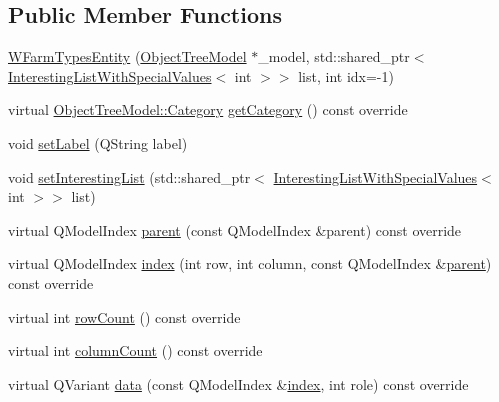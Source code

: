 \subsection*{Public Member Functions}
\begin{DoxyCompactItemize}
\item 
\mbox{\hyperlink{classobjecttree_1_1_w_farm_types_entity_a6111c055eedc08d09d831d1521a07dd5}{W\+Farm\+Types\+Entity}} (\mbox{\hyperlink{class_object_tree_model}{Object\+Tree\+Model}} $\ast$\+\_\+model, std\+::shared\+\_\+ptr$<$ \mbox{\hyperlink{class_interesting_list_with_special_values}{Interesting\+List\+With\+Special\+Values}}$<$ int $>$$>$ list, int idx=-\/1)
\item 
virtual \mbox{\hyperlink{class_object_tree_model_a379e9d6b0d381853785adf62095ba4e3}{Object\+Tree\+Model\+::\+Category}} \mbox{\hyperlink{classobjecttree_1_1_w_farm_types_entity_af3e12199001b2f424c985aeea28a0fd8}{get\+Category}} () const override
\item 
void \mbox{\hyperlink{classobjecttree_1_1_w_farm_types_entity_ae176bbd77fefb1cc6bfe53346523093f}{set\+Label}} (Q\+String label)
\item 
void \mbox{\hyperlink{classobjecttree_1_1_w_farm_types_entity_ab32b3cd66c1749cbf17ee9bcce8e76ff}{set\+Interesting\+List}} (std\+::shared\+\_\+ptr$<$ \mbox{\hyperlink{class_interesting_list_with_special_values}{Interesting\+List\+With\+Special\+Values}}$<$ int $>$$>$ list)
\item 
virtual Q\+Model\+Index \mbox{\hyperlink{classobjecttree_1_1_w_farm_types_entity_a17be5fffa20cf74e8cb1919e13eb48a4}{parent}} (const Q\+Model\+Index \&parent) const override
\item 
virtual Q\+Model\+Index \mbox{\hyperlink{classobjecttree_1_1_w_farm_types_entity_ae756759d943f0de894f9013a89019518}{index}} (int row, int column, const Q\+Model\+Index \&\mbox{\hyperlink{classobjecttree_1_1_w_farm_types_entity_a17be5fffa20cf74e8cb1919e13eb48a4}{parent}}) const override
\item 
virtual int \mbox{\hyperlink{classobjecttree_1_1_w_farm_types_entity_a79fea0a65bed3d3e29b78e15a5db63df}{row\+Count}} () const override
\item 
virtual int \mbox{\hyperlink{classobjecttree_1_1_w_farm_types_entity_aef59def54e47861bf44979b11ec0deb6}{column\+Count}} () const override
\item 
virtual Q\+Variant \mbox{\hyperlink{classobjecttree_1_1_w_farm_types_entity_af7ca039e9e86f51bb196e4faf3ee1989}{data}} (const Q\+Model\+Index \&\mbox{\hyperlink{classobjecttree_1_1_w_farm_types_entity_ae756759d943f0de894f9013a89019518}{index}}, int role) const override

\end{DoxyCompactItemize}
